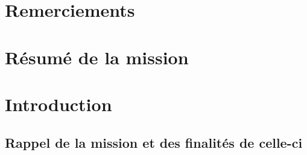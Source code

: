 \documentclass[a4paper, 12pt]{article}
\begin{document}
\onehalfspacing %

\renewcommand{\listfigurename}{Table des illustrations}
\renewcommand{\figurename}{Illustration}
\renewcommand{\tablename}{Tableau}
\renewcommand{\contentsname}{Sommaire}

\maketitle
\thispagestyle{empty}
\newpage{}


\tableofcontents
\thispagestyle{empty}
\newpage{}

\setcounter{page}{1}

\section{Remerciements}

    
    \newpage{}

\section{Résumé de la mission}

    
    \newpage{}

\section{Introduction}


\subsection{Rappel de la mission et des finalités de celle-ci}

    
    \newpage{}

\end{document}
